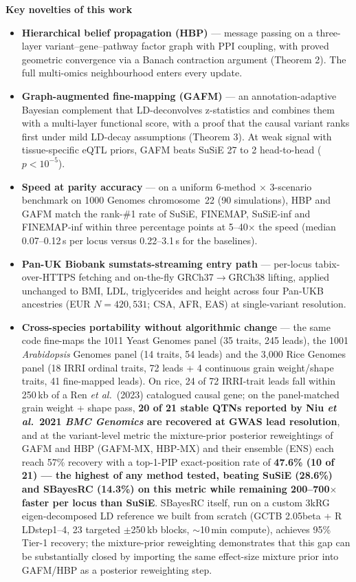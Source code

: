 \documentclass[11pt,a4paper]{article}
\begin{document}
\textbf{Key novelties of this work}
\begin{itemize}
\item \textbf{Hierarchical belief propagation (HBP)} --- message passing on a three-layer
variant--gene--pathway factor graph with PPI coupling, with proved geometric convergence via a
Banach contraction argument (Theorem 2). The full multi-omics neighbourhood enters every
update.
\item \textbf{Graph-augmented fine-mapping (GAFM)} --- an annotation-adaptive Bayesian
complement that LD-deconvolves z-statistics and combines them with a multi-layer functional
score, with a proof that the causal variant ranks first under mild LD-decay assumptions
(Theorem 3). At weak signal with tissue-specific eQTL priors, GAFM beats SuSiE 27 to 2
head-to-head ($p < 10^{-5}$).
\item \textbf{Speed at parity accuracy} --- on a uniform 6-method $\times$ 3-scenario benchmark
on 1000 Genomes chromosome~22 (90 simulations), HBP and GAFM match the rank-\#1 rate of SuSiE,
FINEMAP, SuSiE-inf and FINEMAP-inf within three percentage points at 5--40$\times$ the speed
(median 0.07--0.12\,s per locus versus 0.22--3.1\,s for the baselines).
\item \textbf{Pan-UK Biobank sumstats-streaming entry path} --- per-locus tabix-over-HTTPS
fetching and on-the-fly GRCh37$\to$GRCh38 lifting, applied unchanged to BMI, LDL,
triglycerides and height across four Pan-UKB ancestries (EUR $N{=}420{,}531$;
CSA, AFR, EAS) at single-variant resolution.
\item \textbf{Cross-species portability without algorithmic change} --- the same code
fine-maps the 1011 Yeast Genomes panel (35 traits, 245 leads), the 1001 \emph{Arabidopsis}
Genomes panel (14 traits, 54 leads) and the 3{,}000 Rice Genomes panel (18 IRRI ordinal
traits, 72 leads + 4 continuous grain weight/shape traits, 41 fine-mapped leads). On rice,
24 of 72 IRRI-trait leads fall within 250\,kb of a Ren \emph{et al.}\ (2023) catalogued
causal gene; on the panel-matched grain weight + shape pass, \textbf{20 of 21 stable QTNs
reported by Niu \emph{et al.}\ 2021 \emph{BMC Genomics} are recovered at GWAS lead
resolution}, and at the variant-level metric the mixture-prior posterior reweightings
of GAFM and HBP (GAFM-MX, HBP-MX) and their ensemble (ENS) each reach 57\% recovery
with a top-1-PIP exact-position rate of \textbf{47.6\%
(10 of 21) --- the highest of any method tested, beating SuSiE (28.6\%) and SBayesRC (14.3\%)
on this metric while remaining 200--700$\times$ faster per locus than SuSiE}. SBayesRC
itself, run on a custom 3kRG eigen-decomposed LD reference we built from scratch
(GCTB 2.05beta + R LDstep1--4, 23 targeted $\pm$250\,kb blocks, ${\sim}$10\,min compute),
achieves 95\% Tier-1 recovery; the mixture-prior reweighting demonstrates that this
gap can be substantially closed by importing the same effect-size mixture prior into
GAFM/HBP as a posterior reweighting step.
\end{itemize}
\end{document}
